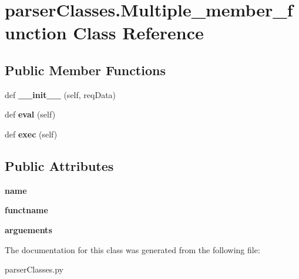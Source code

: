 \hypertarget{classparser_classes_1_1_multiple__member__function}{}\section{parser\+Classes.\+Multiple\+\_\+member\+\_\+function Class Reference}
\label{classparser_classes_1_1_multiple__member__function}
\subsection*{Public Member Functions}
\begin{DoxyCompactItemize}
\item 
def {\bfseries \+\_\+\+\_\+init\+\_\+\+\_\+} (self, req\+Data)\hypertarget{classparser_classes_1_1_multiple__member__function_a49138664c1c079a08daebd21d676616f}{}\label{classparser_classes_1_1_multiple__member__function_a49138664c1c079a08daebd21d676616f}

\item 
def {\bfseries eval} (self)\hypertarget{classparser_classes_1_1_multiple__member__function_abbd74e3f6048c0feabfe52e257cbd91a}{}\label{classparser_classes_1_1_multiple__member__function_abbd74e3f6048c0feabfe52e257cbd91a}

\item 
def {\bfseries exec} (self)\hypertarget{classparser_classes_1_1_multiple__member__function_a158a2a6d96d99c42350fe9245614a9ee}{}\label{classparser_classes_1_1_multiple__member__function_a158a2a6d96d99c42350fe9245614a9ee}

\end{DoxyCompactItemize}
\subsection*{Public Attributes}
\begin{DoxyCompactItemize}
\item 
{\bfseries name}\hypertarget{classparser_classes_1_1_multiple__member__function_a841b86dab291bf9deb8f873f58864f9e}{}\label{classparser_classes_1_1_multiple__member__function_a841b86dab291bf9deb8f873f58864f9e}

\item 
{\bfseries functname}\hypertarget{classparser_classes_1_1_multiple__member__function_a69614fc7d47fe2f241bbe186ac027b56}{}\label{classparser_classes_1_1_multiple__member__function_a69614fc7d47fe2f241bbe186ac027b56}

\item 
{\bfseries arguements}\hypertarget{classparser_classes_1_1_multiple__member__function_a444d7614f6b7aa98ab83c1ff8f1fbe7c}{}\label{classparser_classes_1_1_multiple__member__function_a444d7614f6b7aa98ab83c1ff8f1fbe7c}

\end{DoxyCompactItemize}


The documentation for this class was generated from the following file\+:\begin{DoxyCompactItemize}
\item 
parser\+Classes.\+py\end{DoxyCompactItemize}
